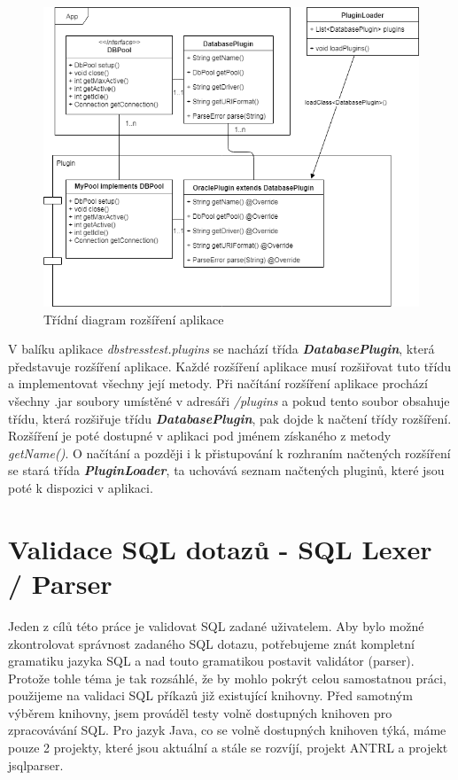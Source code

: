 \documentclass[czech,bachelor,public,dept460,male,cpdeclaration,twoside]{diploma}
\begin{document}
\newpage
\begin{figure}[!htbp]\centering\includegraphics[width=1.0\textwidth]{Figures/plugins.png}\caption{Třídní diagram rozšíření aplikace}
\label{pluginsdiag}
\end{figure}

V balíku aplikace \textit{dbstresstest.plugins} se nachází třída \textbf{\emph{DatabasePlugin}}, která představuje rozšíření aplikace. Každé rozšíření aplikace musí rozšiřovat tuto třídu a implementovat všechny její metody. Při načítání rozšíření aplikace prochází všechny .jar soubory umístěné v adresáři \textit{/plugins} a pokud tento soubor obsahuje třídu, která rozšiřuje třídu \textbf{\emph{DatabasePlugin}}, pak dojde k načtení třídy rozšíření. Rozšíření je poté dostupné v aplikaci pod jménem získaného z metody \textit{getName()}. O načítání a později i k přistupování k rozhraním načtených rozšíření se stará třída \textbf{\emph{PluginLoader}}, ta uchovává seznam načtených pluginů, které jsou poté k dispozici v aplikaci.



\newpage
\section{Validace SQL dotazů - SQL Lexer / Parser} \label{parsers}
Jeden z cílů této práce je validovat SQL zadané uživatelem. Aby bylo možné zkontrolovat správnost zadaného SQL dotazu, potřebujeme znát kompletní gramatiku jazyka SQL a nad touto gramatikou postavit validátor (parser). Protože tohle téma je tak rozsáhlé, že by mohlo pokrýt celou samostatnou práci, použijeme na validaci SQL příkazů již existující knihovny. Před samotným výběrem knihovny, jsem prováděl testy volně dostupných knihoven pro zpracovávání SQL. Pro jazyk Java, co se volně dostupných knihoven týká, máme pouze 2 projekty, které jsou aktuální a stále se rozvíjí, projekt ANTRL a projekt jsqlparser.
\end{document}

